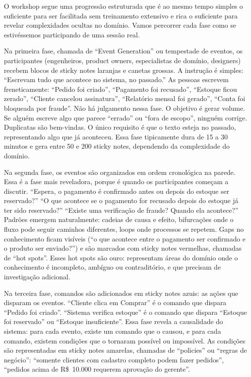 O workshop segue uma progressão estruturada que é ao mesmo tempo simples o
suficiente para ser facilitada sem treinamento extensivo e rica o suficiente
para revelar complexidades ocultas no domínio. Vamos percorrer cada fase
como se estivéssemos participando de uma sessão real.

Na primeira fase, chamada de ``Event Generation'' ou tempestade de eventos,
os participantes (engenheiros, product owners, especialistas de domínio,
designers) recebem blocos de sticky notes laranjas e canetas grossas.
A instrução é simples: ``Escrevam tudo que acontece no sistema, no passado.''
As pessoas escrevem freneticamente: ``Pedido foi criado'', ``Pagamento foi
recusado'', ``Estoque ficou zerado'', ``Cliente cancelou assinatura'',
``Relatório mensal foi gerado'', ``Conta foi bloqueada por fraude''. Não há
julgamento nessa fase. O objetivo é gerar volume. Se alguém escreve algo
que parece ``errado'' ou ``fora de escopo'', ninguém corrige. Duplicatas são
bem-vindas. O único requisito é que o texto esteja no passado, representando
algo que já aconteceu. Essa fase tipicamente dura de 15 a 30 minutos e gera
entre 50 e 200 sticky notes, dependendo da complexidade do domínio.

Na segunda fase, os eventos são organizados em ordem cronológica na parede.
Essa é a fase mais reveladora, porque é quando os participantes começam a
discutir. ``Espera, o pagamento é confirmado antes ou depois do estoque ser
reservado?'' ``O que acontece se o pagamento for recusado depois do estoque
já ter sido reservado?'' ``Existe uma verificação de fraude? Quando ela
acontece?'' Padrões emergem naturalmente: cadeias de causa e efeito,
bifurcações onde o fluxo pode seguir caminhos diferentes, loops onde
processos se repetem. Gaps no conhecimento ficam visíveis (``o que
acontece entre o pagamento ser confirmado e o produto ser enviado?'') e
são marcados com sticky notes vermelhas, chamadas de ``hot spots''. Esses
hot spots são ouro: representam áreas do domínio onde o conhecimento é
incompleto, ambíguo ou contraditório, e que precisam de investigação adicional.

Na terceira fase, comandos são adicionados em sticky notes azuis: as ações
que disparam os eventos. ``Cliente clica em Comprar'' é o comando que
dispara ``Pedido foi criado''. ``Sistema verifica estoque'' é o comando que
dispara ``Estoque foi reservado'' ou ``Estoque insuficiente''. Essa fase
revela a causalidade do sistema: para cada evento, existe um comando que o
causou, e para cada comando, existem condições que o tornaram possível ou
impossível. As condições são representadas em sticky notes amarelas,
chamadas de ``policies'' ou ``regras de negócio'': ``somente clientes com
cadastro completo podem fazer pedidos'', ``pedidos acima de R\$~10.000
requerem aprovação do gerente''.

